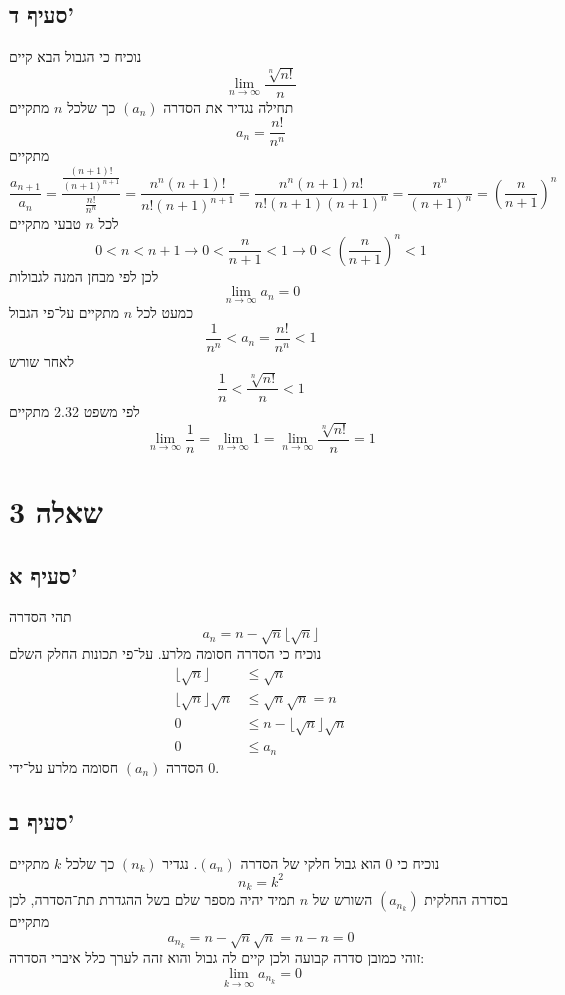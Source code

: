 \documentclass[a4paper]{article}
\begin{document}
\subsection{סעיף ד'}
נוכיח כי הגבול הבא קיים
\[
	\lim_{n \to \infty} \frac{\sqrt[n]{n!}}{n}
\]
תחילה נגדיר את הסדרה $(a_n)$ כך שלכל $n$ מתקיים
\[
	a_n = \frac{n!}{n^n}
\]
מתקיים
\[
	\frac{a_{n + 1}}{a_n}
	= \frac{\frac{(n + 1)!}{{(n + 1)}^{n + 1}}}{\frac{n!}{n^n}}
	= \frac{n^n (n + 1)!}{n! {(n + 1)}^{n + 1}}
	= \frac{n^n (n + 1) n!}{n! (n + 1) {(n + 1)}^n}
	= \frac{n^n}{{(n + 1)}^n}
	= {\left( \frac{n}{n + 1} \right)}^n
\]
לכל $n$ טבעי מתקיים
\[
	0 < n < n + 1
	\rightarrow
	0 < \frac{n}{n + 1} < 1
	\rightarrow 
	0 < {\left( \frac{n}{n + 1} \right)}^n < 1
\]
לכן לפי מבחן המנה לגבולות
\[
	\lim_{n \to \infty} a_n = 0
\]
כמעט לכל $n$ מתקיים על־פי הגבול
\[
	\frac{1}{n^n} < a_n = \frac{n!}{n^n} < 1
\]
לאחר שורש
\[
	\frac{1}{n} < \frac{\sqrt[n]{n!}}{n} < 1
\]
לפי משפט 2.32 מתקיים
\[
	\lim_{n \to \infty} \frac{1}{n}
	= \lim_{n \to \infty} 1
	= \lim_{n \to \infty} \frac{\sqrt[n]{n!}}{n}
	= 1
\]

\section{שאלה 3}
\subsection{סעיף א'}
תהי הסדרה
\[
	a_n = n - \sqrt{n} \lfloor \sqrt{n} \rfloor
\]
נוכיח כי הסדרה חסומה מלרע.
על־פי תכונות החלק השלם
\begin{align*}
	\lfloor \sqrt{n} \rfloor & \le \sqrt{n} \\
	\lfloor \sqrt{n} \rfloor \sqrt{n} & \le \sqrt{n} \sqrt{n} = n \\
	0 & \le n - \lfloor \sqrt{n} \rfloor \sqrt{n} \\
	0 & \le a_n
\end{align*}
הסדרה $(a_n)$ חסומה מלרע על־ידי $0$.

\subsection{סעיף ב'}
נוכיח כי $0$ הוא גבול חלקי של הסדרה $(a_n)$.
נגדיר $(n_k)$ כך שלכל $k$ מתקיים
\[
	n_k = k^2
\]
בסדרה החלקית $(a_{n_k})$ השורש של $n$ תמיד יהיה מספר שלם בשל ההגדרת תת־הסדרה,
לכן מתקיים
\[
	a_{n_k} = n - \sqrt{n} \sqrt{n} = n - n = 0
\]
זוהי כמובן סדרה קבועה ולכן קיים לה גבול והוא זהה לערך כלל איברי הסדרה:
\[
	\lim_{k \to \infty} a_{n_k} = 0
\]
\end{document}

